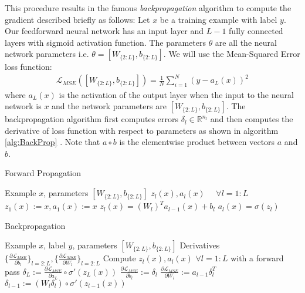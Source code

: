This procedure results in the famous \textit{backpropagation} algorithm to compute the gradient described briefly as follows:
Let $x$ be a training example with label $y$. Our feedforward neural network has an input layer and $L-1$ fully connected layers with sigmoid activation function. The parameters $\theta$ are all the neural network parameters i.e. $\theta = [W_{\{2:L\}}, b_{\{2:L\}}]$. We will use the Mean-Squared Error loss function:
\begin{align}
\mathcal{L}_{MSE} ([W_{\{2:L\}}, b_{\{2:L\}}]) = \frac{1}{N} \sum_{i=1}^N ( y - a_L(x))^2
\end{align}
where $a_L(x)$ is the activation of the output layer when the input to the neural network is $x$ and the network parameters are $[W_{\{2:L\}}, b_{\{2:L\}}]$.
The backpropagation algorithm first computes errors $\delta_l \in \mathbb{R}^{n_l}$ and then computes the derivative of loss function with respect to parameters as shown in algorithm \ref{alg:BackProp} \cite{Conway2000}. Note that $a \circ b$ is the elementwise product between vectors $a$ and $b$.
\begin{algorithm}[tb]
   \caption{Forward Propagation}
   \label{alg:FwdPass}
\begin{algorithmic}
    Example $x$, parameters $[W_{\{2:L\}}, b_{\{2:L\}}]$
    $z_l(x), a_l(x) \hspace{16pt} \forall l=1:L$
   \STATE
   \STATE $z_1(x) := x, a_1(x) := x$
   \STATE $z_l(x) = (W_l)^T a_{l-1}(x) + b_l$
   \STATE $a_l(x) = \sigma(z_l)$
   \ENDFOR
\end{algorithmic}
\end{algorithm}
\begin{algorithm}[tb]
   \caption{Backpropagation}
   \label{alg:BackProp}
\begin{algorithmic}
    Example $x$, label $y$, parameters $[W_{\{2:L\}}, b_{\{2:L\}}]$
    Derivatives $\{\frac{\partial \mathcal{L}_{MSE}}{\partial b_l}\}_{l=2:L}, \{\frac{\partial \mathcal{L}_{MSE}}{\partial W_l}\}_{l=2:L}$
   \STATE
   \STATE Compute $z_l(x), a_l(x) \hspace{4pt} \forall l=1:L$ with a forward pass
   \STATE $\delta_L := \frac{\partial \mathcal{L}_{MSE}}{\partial a_L} \circ \sigma'(z_L(x))$
   \STATE $\frac{\partial \mathcal{L}_{MSE}}{\partial b_l} := \delta_l$
   \STATE $\frac{\partial \mathcal{L}_{MSE}}{\partial W_l} := a_{l-1} \delta_l^T$
   \STATE $\delta_{l-1} := (W_l \delta_l) \circ \sigma'(z_{l-1}(x))$
   \ENDFOR
\end{algorithmic}
\end{algorithm}